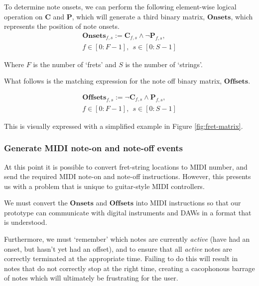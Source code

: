To determine note onsets, we can perform the following element-wise logical operation on $\mathbf{C}$ and $\mathbf{P}$, which will generate a third binary matrix,  $\mathbf{Onsets}$, which represents the position of note onsets. 
\begin{equation} \label{eq:onsets}
\begin{aligned}
\mathbf{Onsets}_{f,s} := \mathbf{C}_{f,s} \land \lnot \mathbf{P}_{f,s}, \\
 f \in [0:F-1],  \: \:  s \in [0:S-1]
\end{aligned}
\end{equation}

Where $F$ is the number of `frets' and $S$ is the number of `strings'. 

What follows is the matching expression for the note off binary matrix, $\mathbf{Offsets}$. 

\begin{equation} \label{eq:offsets}
\begin{aligned}
\mathbf{Offsets}_{f,s} := \lnot \mathbf{C}_{f,s} \land \mathbf{P}_{f,s}, \\
 f \in [0:F-1],  \: \:  s \in [0:S-1]
\end{aligned}
\end{equation}

This is visually expressed with a simplified example in Figure \ref{fig:fret-matrix}.


\subsubsection{Generate MIDI note-on and note-off events}

At this point it is possible to convert fret-string locations to MIDI number, and send the required MIDI note-on and note-off instructions. However, this presents us with a problem that is unique to guitar-style MIDI controllers.

We must convert the $\mathbf{Onsets}$ and $\mathbf{Offsets}$ into MIDI instructions so that our prototype can communicate with digital instruments and DAWs in a format that is understood.

Furthermore, we must `remember' which notes are currently \textit{active} (have had an onset, but hasn't yet had an offset), and to ensure that all \textit{active} notes are correctly terminated at the appropriate time. Failing to do this will result in notes that do not correctly stop at the right time, creating a cacophonous barrage of notes which will ultimately be frustrating for the user.

